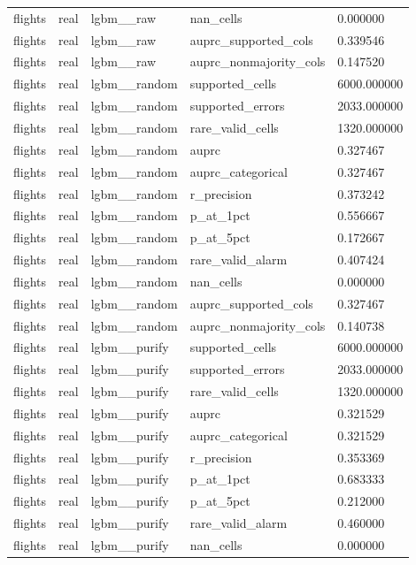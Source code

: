 \begin{tabular}{lllll}
flights & real & lgbm\_\_raw & nan\_cells & 0.000000 \\
flights & real & lgbm\_\_raw & auprc\_supported\_cols & 0.339546 \\
flights & real & lgbm\_\_raw & auprc\_nonmajority\_cols & 0.147520 \\
flights & real & lgbm\_\_random & supported\_cells & 6000.000000 \\
flights & real & lgbm\_\_random & supported\_errors & 2033.000000 \\
flights & real & lgbm\_\_random & rare\_valid\_cells & 1320.000000 \\
flights & real & lgbm\_\_random & auprc & 0.327467 \\
flights & real & lgbm\_\_random & auprc\_categorical & 0.327467 \\
flights & real & lgbm\_\_random & r\_precision & 0.373242 \\
flights & real & lgbm\_\_random & p\_at\_1pct & 0.556667 \\
flights & real & lgbm\_\_random & p\_at\_5pct & 0.172667 \\
flights & real & lgbm\_\_random & rare\_valid\_alarm & 0.407424 \\
flights & real & lgbm\_\_random & nan\_cells & 0.000000 \\
flights & real & lgbm\_\_random & auprc\_supported\_cols & 0.327467 \\
flights & real & lgbm\_\_random & auprc\_nonmajority\_cols & 0.140738 \\
flights & real & lgbm\_\_purify & supported\_cells & 6000.000000 \\
flights & real & lgbm\_\_purify & supported\_errors & 2033.000000 \\
flights & real & lgbm\_\_purify & rare\_valid\_cells & 1320.000000 \\
flights & real & lgbm\_\_purify & auprc & 0.321529 \\
flights & real & lgbm\_\_purify & auprc\_categorical & 0.321529 \\
flights & real & lgbm\_\_purify & r\_precision & 0.353369 \\
flights & real & lgbm\_\_purify & p\_at\_1pct & 0.683333 \\
flights & real & lgbm\_\_purify & p\_at\_5pct & 0.212000 \\
flights & real & lgbm\_\_purify & rare\_valid\_alarm & 0.460000 \\
flights & real & lgbm\_\_purify & nan\_cells & 0.000000 \\

\end{tabular}
